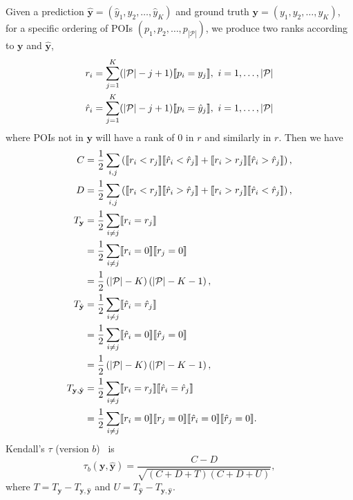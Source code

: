 Given a prediction $\hat{\mathbf{y}} = (\hat{y}_1, \hat{y}_2, \dots, \hat{y}_K)$ and ground truth $\mathbf{y} = (y_1, y_2, \dots, y_K)$,
for a specific ordering of POIs $(p_1, p_2, \dots, p_{|\mathcal{P}|})$,
we produce two ranks according to $\mathbf{y}$ and $\hat{\mathbf{y}}$,
\begin{align*}
r_i       &= \sum_{j=1}^K (| \mathcal{P} | - j + 1)  \llbracket p_i = y_j \rrbracket,~
i = 1, \dots, | \mathcal{P} | \\
\hat{r}_i &= \sum_{j=1}^K (| \mathcal{P} | - j + 1)  \llbracket p_i = \hat{y}_j \rrbracket,~ 
i = 1, \dots, | \mathcal{P} |
\end{align*}
where POIs not in $\mathbf{y}$ will have a rank of $0$ in $r$ and similarly in $r$.
Then we have
\begin{align*}
C &= \frac{1}{2} \sum_{i,j} \left(\llbracket r_i < r_j \rrbracket  \llbracket \hat{r}_i < \hat{r}_j \rrbracket +
     \llbracket r_i > r_j \rrbracket  \llbracket \hat{r}_i > \hat{r}_j \rrbracket \right), \\
D &= \frac{1}{2} \sum_{i,j} \left(\llbracket r_i < r_j \rrbracket  \llbracket \hat{r}_i > \hat{r}_j \rrbracket +
     \llbracket r_i > r_j \rrbracket  \llbracket \hat{r}_i < \hat{r}_j \rrbracket \right), \\
T_{\mathbf{y}} &= \frac{1}{2} \sum_{i \ne j} \llbracket r_i = r_j \rrbracket \\
               &= \frac{1}{2} \sum_{i \ne j} \llbracket r_i = 0 \rrbracket  \llbracket r_j = 0 \rrbracket \\
               &= \frac{1}{2} \left( |\mathcal{P}| - K \right) \left( |\mathcal{P}| - K - 1 \right), \\ 
T_{\hat{\mathbf{y}}} &= \frac{1}{2} \sum_{i \ne j} \llbracket \hat{r}_i = \hat{r}_j \rrbracket \\
                     &= \frac{1}{2} \sum_{i \ne j} \llbracket \hat{r}_i = 0 \rrbracket  \llbracket \hat{r}_j = 0 \rrbracket \\
                     &= \frac{1}{2} \left( |\mathcal{P}| - K \right) \left( |\mathcal{P}| - K - 1 \right), \\ 
T_{\mathbf{y},\hat{\mathbf{y}}} &= \frac{1}{2} \sum_{i \ne j} \llbracket r_i = r_j \rrbracket  \llbracket \hat{r}_i = \hat{r}_j \rrbracket \\
                                &= \frac{1}{2} \sum_{i \ne j} \llbracket r_i = 0 \rrbracket  \llbracket r_j = 0 \rrbracket 
                                   \llbracket \hat{r}_i = 0 \rrbracket  \llbracket \hat{r}_j = 0 \rrbracket.
\end{align*}
Kendall's $\tau$ (version $b$)~\cite{kendall1945,agresti2010analysis} is
\begin{equation*}
\tau_b(\mathbf{y}, \hat{\mathbf{y}}) = \frac{C - D}{\sqrt{(C + D + T) (C + D + U)}},
\end{equation*}
where $T = T_{\mathbf{y}} - T_{\mathbf{y},\hat{\mathbf{y}}}$ and $U = T_{\hat{\mathbf{y}}} - T_{\mathbf{y},\hat{\mathbf{y}}}$.

